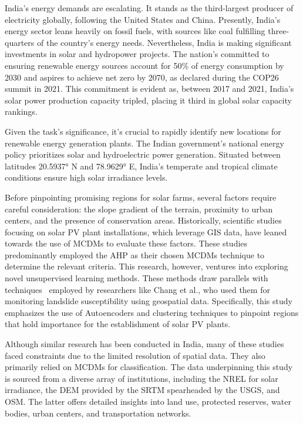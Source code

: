 \documentclass[a4paper,12pt]{Classes/RoboticsLaTeX}
\begin{document}
	India's energy demands are escalating. It stands as the third-largest producer of electricity globally, following the United States and China\cite{bp2021}. 
	Presently, India's energy sector leans heavily on fossil fuels, with sources like coal fulfilling three-quarters of the country's energy needs. Nevertheless, 
	India is making significant investments in solar and hydropower projects. The nation's committed to ensuring renewable energy sources account for 
	50\% of energy consumption by 2030 and aspires to achieve net zero by 2070, as declared during the COP26 summit in 2021\cite{bbc2023}. This commitment 
	is evident as, between 2017 and 2021, India's solar power production capacity tripled, placing it third in global solar capacity rankings\cite{reuters2022}.

	Given the task's significance, it's crucial to rapidly identify new locations for renewable energy generation plants. The Indian government's national energy policy 
	prioritizes solar and hydroelectric power generation. Situated between latitudes 20.5937° N and 78.9629° E, India's temperate and tropical climate conditions ensure 
	high solar irradiance levels.

	Before pinpointing promising regions for solar farms, several factors require careful consideration: the slope gradient of the terrain, proximity to urban centers, and the 
	presence of conservation areas. Historically, scientific studies focusing on solar \ac{PV} plant installations, which leverage GIS data, have leaned towards the use of 
	\ac{MCDMs} to evaluate these factors\cite{reuters2022,colak2020,garni2017,zoghi2017,saraswat2021}. These studies predominantly employed the \ac{AHP} as their chosen \ac{MCDMs} 
	technique to determine the relevant criteria. This research, however, ventures into exploring novel unsupervised learning methods. These methods draw parallels with techniques \
	employed by researchers like Chang et al., who used them for monitoring landslide susceptibility using geospatial data\cite{chang2020}. Specifically, this study emphasizes the 
	use of Autoencoders and clustering techniques to pinpoint regions that hold importance for the establishment of solar \ac{PV} plants.

	Although similar research has been conducted in India, many of these studies faced constraints due to the limited resolution of spatial 
	data\cite{jain2011,saraswat2021,sindhu2017}. They also primarily relied on \ac{MCDMs} for classification. The data underpinning this study is sourced from a diverse array of 
	institutions, including the \ac{NREL} for solar irradiance, the \ac{DEM} provided by the \ac{SRTM} spearheaded by the \ac{USGS}, and \ac{OSM}. The latter offers detailed insights into land use, protected reserves, water bodies, 
	urban centers, and transportation networks.
\end{document}
